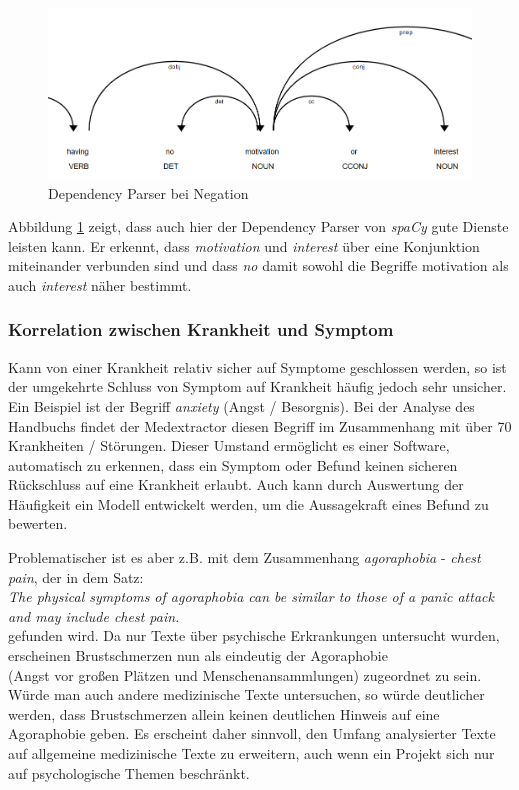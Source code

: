 \begin{figure}[h]
    \centering
    \includegraphics[width=\textwidth]{pictures/Dep_Parser_Negation.png}
    \caption{Dependency Parser bei Negation}
    \label{fig:negation}
\end{figure}

Abbildung \ref{fig:negation} zeigt, dass auch hier der Dependency Parser von \emph{spaCy} gute Dienste leisten kann. Er erkennt, dass \emph{motivation} und \emph{interest} über eine Konjunktion miteinander verbunden sind und dass \emph{no} damit sowohl die Begriffe {motivation} als auch \emph{interest} näher bestimmt.

\subsubsection{Korrelation zwischen Krankheit und Symptom}
\label{subsec: stigmatisierung} 

Kann von einer Krankheit relativ sicher auf Symptome geschlossen werden, so ist der umgekehrte Schluss von Symptom auf Krankheit häufig jedoch sehr unsicher. Ein Beispiel ist der Begriff \emph{anxiety} (Angst / Besorgnis). Bei der Analyse des Handbuchs findet der Medextractor diesen Begriff im Zusammenhang mit über 70 Krankheiten / Störungen. Dieser Umstand ermöglicht es einer Software, automatisch zu erkennen, dass ein Symptom oder Befund keinen sicheren Rückschluss auf eine Krankheit erlaubt. Auch kann durch Auswertung der Häufigkeit ein Modell entwickelt werden, um die Aussagekraft eines Befund zu bewerten.

Problematischer ist es aber z.B. mit dem Zusammenhang \emph{agoraphobia} - \emph{chest pain}, der in dem Satz:\\

\emph{\glqq The physical symptoms of agoraphobia can be similar to those of a panic attack and may include chest pain.\grqq}\\

gefunden wird. Da nur Texte über psychische Erkrankungen untersucht wurden, erscheinen Brustschmerzen nun als eindeutig der Agoraphobie \\
(Angst vor großen Plätzen und Menschenansammlungen) zugeordnet zu sein. Würde man auch andere medizinische Texte untersuchen, so würde deutlicher werden, dass Brustschmerzen allein keinen deutlichen Hinweis auf eine Agoraphobie geben. Es erscheint daher sinnvoll, den Umfang analysierter Texte auf allgemeine medizinische Texte zu erweitern, auch wenn ein Projekt sich nur auf psychologische Themen beschränkt.

